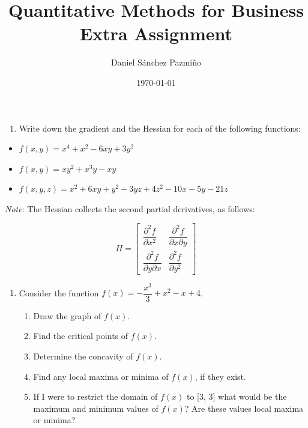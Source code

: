 \documentclass{article}
\title{Quantitative Methods for Business \\[1em] \large Extra Assignment}
\date{\today}
\author{Daniel Sánchez Pazmiño}
\begin{document}
\maketitle

\begin{enumerate}
\item Write down the gradient and the Hessian for each of the following functions:
\end{enumerate}

\begin{itemize}
    \item[(a)] $f(x, y) = x^4 + x^2 - 6xy + 3y^2$
    \item[(b)] $f(x, y) = xy^2 + x^3y - xy$
    \item[(c)] $f(x, y, z) = x^2 + 6xy + y^2 - 3yz + 4z^2 - 10x - 5y - 21z$
\end{itemize}

\textit{Note}: The Hessian collects the second partial derivatives, as follows:

\[
H = \begin{bmatrix}
    \dfrac{\partial^2 f}{\partial x^2} & \dfrac{\partial^2 f}{\partial x \partial y} \\
    \dfrac{\partial^2 f}{\partial y \partial x} & \dfrac{\partial^2 f}{\partial y^2}
\end{bmatrix}
\]

\begin{enumerate}[resume]
    \item Consider the function $f(x) = - \dfrac{x^3}{3} + x^2 - x +4$.
    \begin{enumerate}
        \item Draw the graph of $f(x)$.
        \item Find the critical points of $f(x)$.
        \item Determine the concavity of $f(x)$.
        \item Find any local maxima or minima of $f(x)$, if they exist.
        \item If I were to restrict the domain of $f(x)$ to [3, 3] what would be the maximum and minimum values of $f(x)$? Are these values local maxima or minima?
    \end{enumerate}
\end{enumerate}
\end{document}
